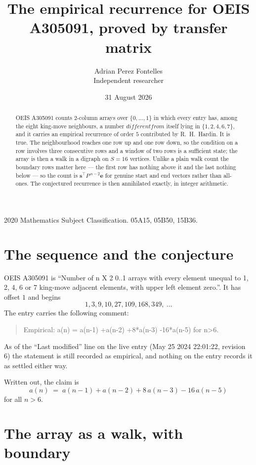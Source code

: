 \documentclass[11pt,a4paper]{article}
\title{The empirical recurrence for OEIS A305091, proved by transfer matrix}
\author{Adrian Perez Fontelles\\ \small Independent researcher}
\date{31 August 2026}
\theoremstyle{plain}
\theoremstyle{definition}
\begin{document}
\maketitle

\begin{abstract}
OEIS A305091 counts $2$-column arrays over $\{0,\dots,1\}$ in which every entry has,
among the eight king-move neighbours, a number $different from$ itself lying in $\{1,2,4,6,7\}$, and it carries an empirical
recurrence of order $5$ contributed by R.~H.~Hardin. It is true. The neighbourhood
reaches one row up and one row down, so the condition on a row involves three consecutive
rows and a window of two rows is a sufficient state; the array is then a walk in a digraph
on $S=16$ vertices. Unlike a plain walk count the boundary rows matter here --- the first
row has nothing above it and the last nothing below --- so the count is
$\mathbf{s}^{\!\top}P^{\,n-2}\mathbf{e}$ for genuine start and end vectors rather than
all-ones. The conjectured recurrence is then annihilated exactly, in integer arithmetic.
\end{abstract}

\noindent\small 2020 Mathematics Subject Classification. 05A15, 05B50, 15B36.\normalsize

\section{The sequence and the conjecture}

OEIS A305091 is ``Number of n X 2 0..1 arrays with every element unequal to 1, 2, 4, 6 or 7 king-move adjacent elements, with upper left element zero.''. It has offset
$1$ and begins
\[
1, 3, 9, 10, 27, 109, 168, 349,\ \dots
\]
The entry carries the following comment:
\begin{quote}\small
Empirical: a(n) = a(n-1) +a(n-2) +8*a(n-3) -16*a(n-5) for n>6.
\end{quote}
As of the ``Last modified'' line on the live entry (May 25 2024 22:01:22, revision
6) the statement is still recorded as empirical, and nothing on the entry
records it as settled either way.

Written out, the claim is
\begin{equation}\label{eq:conj}
a(n)\;=\;a(n-1) + a(n-2) + 8\,a(n-3) - 16\,a(n-5)
\end{equation}
for all $n>6$.

\section{The array as a walk, with boundary}
\end{document}
